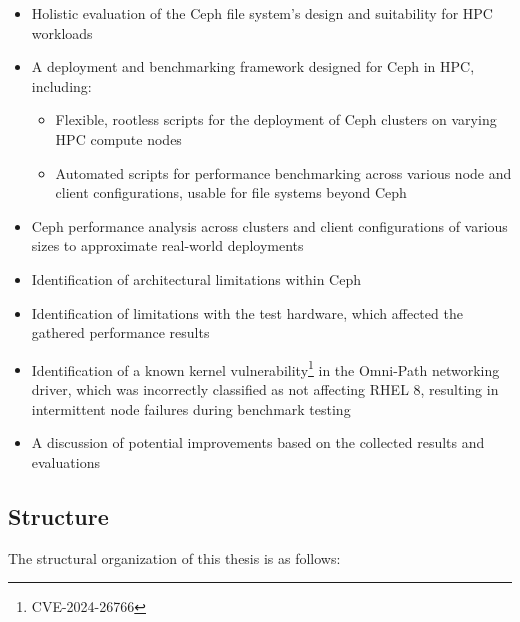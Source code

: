 \begin{itemize}
    \item Holistic evaluation of the Ceph file system's design and suitability for \ac{HPC} workloads
    \item A deployment and benchmarking framework designed for Ceph in \ac{HPC}, including:
    \begin{itemize}
        \item Flexible, rootless scripts for the deployment of Ceph clusters on varying \ac{HPC} compute nodes
        \item Automated scripts for performance benchmarking across various node and client configurations, usable for file systems beyond Ceph
    \end{itemize}
    \item Ceph performance analysis across clusters and client configurations of various sizes to approximate real-world deployments
    \item Identification of architectural limitations within Ceph
    \item Identification of limitations with the test hardware, which affected the gathered performance results
    \item Identification of a known kernel vulnerability\footnote{CVE-2024-26766} in the Omni-Path networking driver, which was incorrectly classified as not affecting \ac{RHEL} 8, resulting in intermittent node failures during benchmark testing
    \item A discussion of potential improvements based on the collected results and evaluations
\end{itemize}

\subsection{Structure}

The structural organization of this thesis is as follows:

